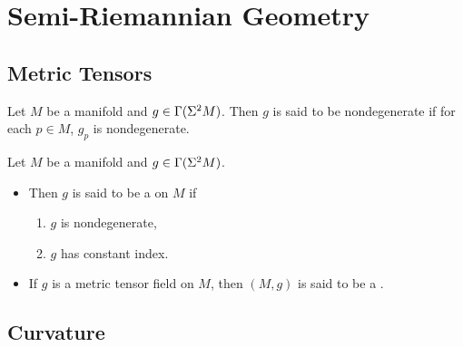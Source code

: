 \documentclass{book}
\begin{document}
	\newpage
	\chapter{Semi-Riemannian Geometry}
	
	\section{Metric Tensors}
	
	\begin{defn}
		Let $M$ be a manifold and $g \in \Gamma(\Sigma^2 M)$. Then $g$ is said to be nondegenerate if for each $p \in M$, $g_p$ is nondegenerate.
		\end{defn}
	
	\begin{defn}
		Let $M$ be a manifold and $g \in \Gamma(\Sigma^2 M)$. 
		\begin{itemize}
			\item Then $g$ is said to be a  on $M$ if 
			\begin{enumerate}
				\item $g$ is nondegenerate,
				\item $g$ has constant index.
			\end{enumerate}
			\item If $g$ is a metric tensor field on $M$, then $(M, g)$ is said to be a .
		\end{itemize}
	\end{defn}

	\begin{defn}
		
	\end{defn}
	



































	\newpage
	
	\section{Curvature}
	
\end{document}
